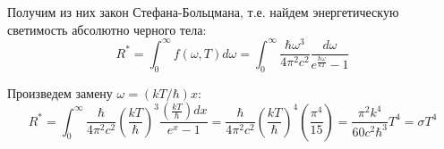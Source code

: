 \documentclass{article}
\begin{document}
	Получим из них закон Стефана-Больцмана, т.е. найдем энергетическую светимость абсолютно черного тела:
	\begin{equation}
		R^* = \int_0^\infty f(\omega,T)d\omega = \int_0^\infty\frac{\hbar\omega^3}{4\pi^2 c^2}\frac{d\omega}{e^{\frac{\hbar\omega}{kT}} - 1}
	\end{equation}

	Произведем замену $\omega = (kT/\hbar)x$:
	\begin{equation}
		R^* = \int_0^\infty\frac{\hbar}{4\pi^2 c^2}(\frac{kT}{\hbar})^3\frac{(\frac{kT}{\hbar})dx}{e^x-1} = \frac{\hbar}{4\pi^2 c^2}(\frac{kT}{\hbar})^4(\frac{\pi^4}{15})=\frac{\pi^2 k^4}{60 c^2 \hbar^3} T^4 = \sigma T^4
	\end{equation}

	
\end{document}
